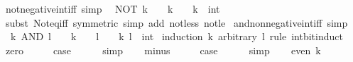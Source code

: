 \begin{isabellebody}
\ not{\isacharunderscore}{\kern0pt}negative{\isacharunderscore}{\kern0pt}int{\isacharunderscore}{\kern0pt}iff\ {\isacharbrackleft}{\kern0pt}simp{\isacharbrackright}{\kern0pt}{\isacharcolon}{\kern0pt}\isanewline
\ \ {\isacartoucheopen}NOT\ k\ {\isacharless}{\kern0pt}\ {}\ {\isasymlongleftrightarrow}\ k\ {\isasymge}\ {}{\isacartoucheclose}\ \ k\ {\isacharcolon}{\kern0pt}{\isacharcolon}{\kern0pt}\ int\isanewline
%
\isadelimproof
\ \ %
\endisadelimproof
%
\isatagproof
{}\isamarkupfalse%
\ {\isacharparenleft}{\kern0pt}subst\ Not{\isacharunderscore}{\kern0pt}eq{\isacharunderscore}{\kern0pt}iff\ {\isacharbrackleft}{\kern0pt}symmetric{\isacharbrackright}{\kern0pt}{\isacharparenright}{\kern0pt}\ {\isacharparenleft}{\kern0pt}simp\ add{\isacharcolon}{\kern0pt}\ not{\isacharunderscore}{\kern0pt}less\ not{\isacharunderscore}{\kern0pt}le{\isacharparenright}{\kern0pt}%
\endisatagproof
{\isafoldproof}%
%
\isadelimproof
\isanewline
%
\endisadelimproof
\isanewline
{}\isamarkupfalse%
\ and{\isacharunderscore}{\kern0pt}nonnegative{\isacharunderscore}{\kern0pt}int{\isacharunderscore}{\kern0pt}iff\ {\isacharbrackleft}{\kern0pt}simp{\isacharbrackright}{\kern0pt}{\isacharcolon}{\kern0pt}\isanewline
\ \ {\isacartoucheopen}k\ AND\ l\ {\isasymge}\ {}\ {\isasymlongleftrightarrow}\ k\ {\isasymge}\ {}\ {\isasymor}\ l\ {\isasymge}\ {}{\isacartoucheclose}\ \ k\ l\ {\isacharcolon}{\kern0pt}{\isacharcolon}{\kern0pt}\ int\isanewline
%
\isadelimproof
%
\endisadelimproof
%
\isatagproof
{}\isamarkupfalse%
\ {\isacharparenleft}{\kern0pt}induction\ k\ arbitrary{\isacharcolon}{\kern0pt}\ l\ rule{\isacharcolon}{\kern0pt}\ int{\isacharunderscore}{\kern0pt}bit{\isacharunderscore}{\kern0pt}induct{\isacharparenright}{\kern0pt}\isanewline
\ \ \isamarkupfalse%
\ zero\isanewline
\ \ \isamarkupfalse%
\ \isamarkupfalse%
\ {\isacharquery}{\kern0pt}case\isanewline
\ \ \ \ \isamarkupfalse%
\ simp\isanewline
{}\isamarkupfalse%
\isanewline
\ \ \isamarkupfalse%
\ minus\isanewline
\ \ \isamarkupfalse%
\ \isamarkupfalse%
\ {\isacharquery}{\kern0pt}case\isanewline
\ \ \ \ \isamarkupfalse%
\ simp\isanewline
{}\isamarkupfalse%
\isanewline
\ \ \isamarkupfalse%
\ {\isacharparenleft}{\kern0pt}even\ k{\isacharparenright}{\kern0pt}\isanewline
\ \ \isamarkupfalse%
\ \isamarkupfalse%

\end{isabellebody}
